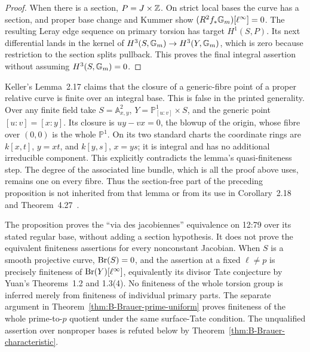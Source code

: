 \begin{proof}
When there is a section, \(P=J\times\mathbb Z\).  On strict local
bases the curve has a section, and proper base change and Kummer
show \((R^2f_*{\mathbb G_m})[\ell^\infty]=0\).  The resulting
Leray edge sequence on primary torsion has target
\(H^1(S,P)\).  Its next differential lands in the kernel of
\(H^3(S,{\mathbb G_m})\to H^3(Y,{\mathbb G_m})\), which is zero because
restriction to the section splits pullback.  This proves the final
integral assertion without assuming \(H^3(S,{\mathbb G_m})=0\).
\end{proof}

\begin{remark}\label{rem:B-Keller-closure-error}
Keller's Lemma~2.17 claims that the closure of a generic-fibre point
of a proper relative curve is finite over an integral base.  This
is false in the printed generality.  Over any finite field take
\(S=\mathbb A^2_{x,y}\), \(Y=\mathbb P^1_{[u:v]}\times S\),
and the generic point \([u:v]=[x:y]\).  Its closure is
\(uy-vx=0\), the blowup of the origin, whose fibre over
\((0,0)\) is the whole \(\mathbb P^1\).  On its two standard
charts the coordinate rings are \(k[x,t]\), \(y=xt\), and
\(k[y,s]\), \(x=ys\); it is integral and has no additional
irreducible component.  This explicitly contradicts the lemma's
quasi-finiteness step.  The degree of the associated line bundle,
which is all the proof above uses, remains one on every fibre.
Thus the section-free part of the preceding proposition is not
inherited from that lemma or from its use in Corollary~2.18 and
Theorem~4.27~\cite[Lemma~2.17]{BKeller2016}.
\end{remark}

The proposition proves the ``via des jacobiennes'' equivalence on
12:79 over its stated regular base, without adding a section
hypothesis.  It does not prove the equivalent finiteness assertions
for every nonconstant Jacobian.  When \(S\) is a smooth projective
curve, \(\operatorname{Br}(S)=0\), and the assertion at a fixed
\(\ell\ne p\) is precisely finiteness of
\(\operatorname{Br}(Y)[\ell^\infty]\), equivalently its divisor Tate
conjecture by Yuan's Theorems~1.2 and 1.3(4).
No finiteness of the whole torsion group is inferred merely from
finiteness of individual primary parts.  The separate argument in
Theorem~\ref{thm:B-Brauer-prime-uniform} proves finiteness of the
whole prime-to-\(p\) quotient under the same surface-Tate
condition.  The unqualified assertion
over nonproper bases is refuted below by
Theorem~\ref{thm:B-Brauer-characteristic}.

